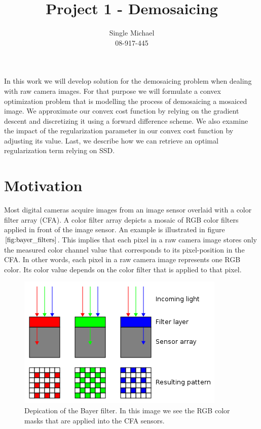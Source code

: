 \documentclass{paper}
\title{Project 1 - Demosaicing}
\author{Single Michael\\08-917-445}
\begin{document}
\maketitle


%


In this work we will develop solution for the demosaicing problem when dealing with raw camera images. For that purpose we will formulate a convex optimization problem that is modelling the process of demosaicing a mosaiced image. We approximate our convex cost function by relying on the gradient descent and discretizing it using a forward difference scheme. We also examine the impact of the regularization parameter in our convex cost function by adjusting its value. Last, we describe how we can retrieve an optimal regularization term relying on SSD. 

\section{Motivation}
Most digital cameras acquire images from an image sensor overlaid with a color filter array (CFA). A color filter array depicts a mosaic of RGB color filters applied in front of the image sensor. An example is illustrated in figure $\ref{fig:bayer_filters}$. This implies that each pixel in a raw camera image stores only the measured color channel value that corresponds to its pixel-position in the CFA. In other words, each pixel in a raw camera image represents one RGB color. Its color value depends on the color filter that is applied to that pixel. 

\begin{figure}[H]
\begin{center}
\quad\quad   \includegraphics[width=0.8\linewidth]{figures/bayerfilter}
\end{center}
\caption{Depication of the Bayer filter. In this image we see the RGB color masks that are applied into the CFA sensors.}
\label{fig:bayer_filters}
\end{figure}
\end{document}
